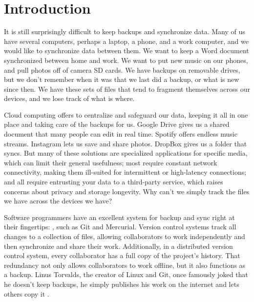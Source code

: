 \chapter{Introduction}

It is still surprisingly difficult to keep backups and synchronize data. Many of
us have several computers, perhaps a laptop, a phone, and a work computer, and
we would like to synchronize data between them. We want to keep a Word document
synchronized between home and work. We want to put new music on our phones, and
pull photos off of camera SD cards. We have backups on removable drives, but we
don't remember when it was that we last did a backup, or what is new since then.
We have these sets of files that tend to fragment themselves across our devices,
and we lose track of what is where.

Cloud computing offers to centralize and safeguard our data, keeping it all in
one place and taking care of the backups for us. Google Drive gives us a shared
document that many people can edit in real time. Spotify offers endless music
streams. Instagram lets us save and share photos. DropBox gives us a folder that
syncs. But many of these solutions are
specialized applications for specific media, which can limit their general
usefulness; most require constant network connectivity, making them ill-suited
for intermittent or high-latency connections; and all require entrusting your
data to a third-party service, which raises concerns about privacy and storage
longevity. Why can't we simply track the files we have across the devices we
have?


Software programmers have an excellent system for backup and sync right at their
fingertips: , such as Git
and Mercurial. Version control systems track all changes to a collection of
files, allowing collaborators to work independently and then synchronize and
share their work. Additionally, in a distributed version control system, every
collaborator has a full copy of the project's history. That redundancy not only
allows collaborators to work offline, but it also functions as a backup. Linus
Torvalds, the creator of Linux and Git, once famously joked that he doesn't keep
backups, he simply publishes his work on the internet and lets others copy it
\cite{linus_no_backups}.

